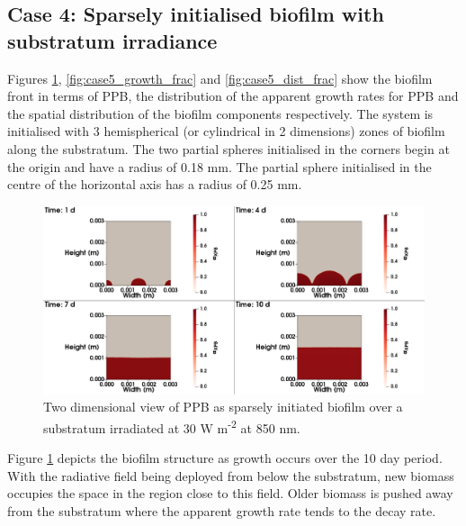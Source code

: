 \subsection{Case 4: Sparsely initialised biofilm with substratum irradiance}

Figures \ref{fig:case5_ppb_frac}, \ref{fig:case5_growth_frac} and \ref{fig:case5_dist_frac} show the biofilm front in terms of PPB, the distribution of the apparent growth rates for PPB and the spatial distribution of the biofilm components respectively. The system is initialised with 3 hemispherical (or cylindrical in 2 dimensions) zones of biofilm along the substratum. The two partial  spheres initialised in the corners begin at the origin and have a radius of 0.18 mm. The partial sphere initialised in the centre of the horizontal axis has a radius of 0.25 mm. 

\begin{figure}[H]
    \centering
     \hspace*{-1cm}\includegraphics[width=1.1\textwidth,height=0.4\textheight]{Chap4/methods/data/figures/case5_ppb_frac.png}
    \caption{Two dimensional view of PPB as sparsely initiated biofilm over a substratum irradiated at 30 W m\textsuperscript{-2} at 850 nm.} 
    \label{fig:case5_ppb_frac}
\end{figure}

Figure \ref{fig:case5_ppb_frac} depicts the biofilm structure as growth occurs over the 10 day period. With the radiative field being deployed from below the substratum, new biomass occupies the space in the region close to this field. Older biomass is pushed away from the substratum where the apparent growth rate tends to the decay rate. 

